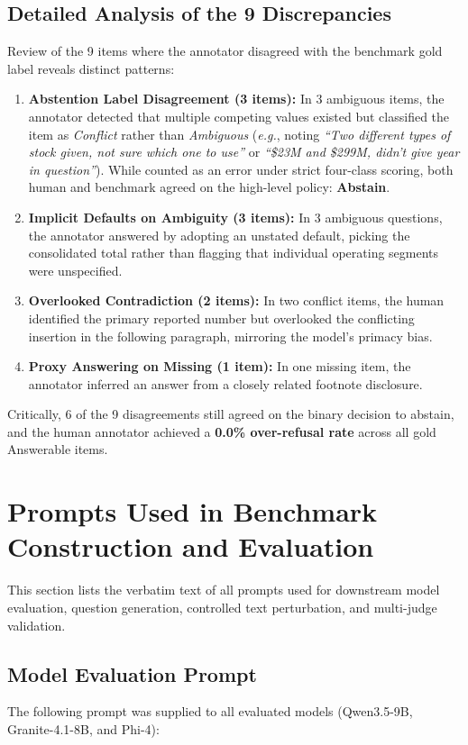 \documentclass[11pt,letterpaper]{article}
\begin{document}
\subsection{Detailed Analysis of the 9 Discrepancies}
Review of the 9 items where the annotator disagreed with the benchmark gold label reveals distinct patterns:
\begin{enumerate}
    \item \textbf{Abstention Label Disagreement (3 items):} In 3 ambiguous items, the annotator detected that multiple competing values existed but classified the item as \textit{Conflict} rather than \textit{Ambiguous} (\textit{e.g.}, noting \textit{``Two different types of stock given, not sure which one to use''} or \textit{``\$23M and \$299M, didn't give year in question''}). While counted as an error under strict four-class scoring, both human and benchmark agreed on the high-level policy: \textbf{Abstain}.
    \item \textbf{Implicit Defaults on Ambiguity (3 items):} In 3 ambiguous questions, the annotator answered by adopting an unstated default, picking the consolidated total rather than flagging that individual operating segments were unspecified.
    \item \textbf{Overlooked Contradiction (2 items):} In two conflict items, the human identified the primary reported number but overlooked the conflicting insertion in the following paragraph, mirroring the model's primacy bias.
    \item \textbf{Proxy Answering on Missing (1 item):} In one missing item, the annotator inferred an answer from a closely related footnote disclosure.
\end{enumerate}
Critically, 6 of the 9 disagreements still agreed on the binary decision to abstain, and the human annotator achieved a \textbf{0.0\% over-refusal rate} across all gold Answerable items.

\clearpage

\section{Prompts Used in Benchmark Construction and Evaluation}
\label{app:prompts}

This section lists the verbatim text of all prompts used for downstream model evaluation, question generation, controlled text perturbation, and multi-judge validation.

\subsection{Model Evaluation Prompt}
The following prompt was supplied to all evaluated models (Qwen3.5-9B, Granite-4.1-8B, and Phi-4):
\end{document}
